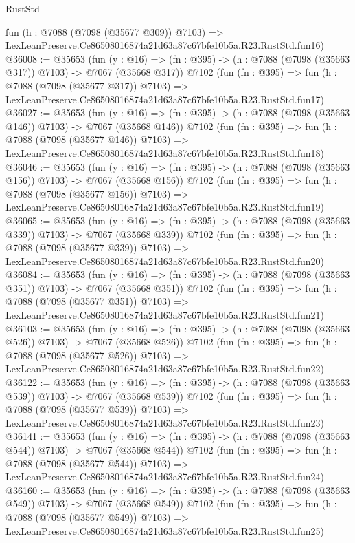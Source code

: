 \begin{lexlean}{RustStd}
\begin{coremodule}
    fun (h : @7088 (@7098 (@35677 @309)) @7103) =>
    LexLeanPreserve.Ce86508016874a21d63a87c67bfe10b5a.R23.RustStd.fun16)
@36008 := @35653
    (fun (y : @16) => (fn : @395) -> (h : @7088 (@7098 (@35663 @317)) @7103) -> @7067 (@35668 @317))
    @7102
    (fun (fn : @395) =>
    fun (h : @7088 (@7098 (@35677 @317)) @7103) =>
    LexLeanPreserve.Ce86508016874a21d63a87c67bfe10b5a.R23.RustStd.fun17)
@36027 := @35653
    (fun (y : @16) => (fn : @395) -> (h : @7088 (@7098 (@35663 @146)) @7103) -> @7067 (@35668 @146))
    @7102
    (fun (fn : @395) =>
    fun (h : @7088 (@7098 (@35677 @146)) @7103) =>
    LexLeanPreserve.Ce86508016874a21d63a87c67bfe10b5a.R23.RustStd.fun18)
@36046 := @35653
    (fun (y : @16) => (fn : @395) -> (h : @7088 (@7098 (@35663 @156)) @7103) -> @7067 (@35668 @156))
    @7102
    (fun (fn : @395) =>
    fun (h : @7088 (@7098 (@35677 @156)) @7103) =>
    LexLeanPreserve.Ce86508016874a21d63a87c67bfe10b5a.R23.RustStd.fun19)
@36065 := @35653
    (fun (y : @16) => (fn : @395) -> (h : @7088 (@7098 (@35663 @339)) @7103) -> @7067 (@35668 @339))
    @7102
    (fun (fn : @395) =>
    fun (h : @7088 (@7098 (@35677 @339)) @7103) =>
    LexLeanPreserve.Ce86508016874a21d63a87c67bfe10b5a.R23.RustStd.fun20)
@36084 := @35653
    (fun (y : @16) => (fn : @395) -> (h : @7088 (@7098 (@35663 @351)) @7103) -> @7067 (@35668 @351))
    @7102
    (fun (fn : @395) =>
    fun (h : @7088 (@7098 (@35677 @351)) @7103) =>
    LexLeanPreserve.Ce86508016874a21d63a87c67bfe10b5a.R23.RustStd.fun21)
@36103 := @35653
    (fun (y : @16) => (fn : @395) -> (h : @7088 (@7098 (@35663 @526)) @7103) -> @7067 (@35668 @526))
    @7102
    (fun (fn : @395) =>
    fun (h : @7088 (@7098 (@35677 @526)) @7103) =>
    LexLeanPreserve.Ce86508016874a21d63a87c67bfe10b5a.R23.RustStd.fun22)
@36122 := @35653
    (fun (y : @16) => (fn : @395) -> (h : @7088 (@7098 (@35663 @539)) @7103) -> @7067 (@35668 @539))
    @7102
    (fun (fn : @395) =>
    fun (h : @7088 (@7098 (@35677 @539)) @7103) =>
    LexLeanPreserve.Ce86508016874a21d63a87c67bfe10b5a.R23.RustStd.fun23)
@36141 := @35653
    (fun (y : @16) => (fn : @395) -> (h : @7088 (@7098 (@35663 @544)) @7103) -> @7067 (@35668 @544))
    @7102
    (fun (fn : @395) =>
    fun (h : @7088 (@7098 (@35677 @544)) @7103) =>
    LexLeanPreserve.Ce86508016874a21d63a87c67bfe10b5a.R23.RustStd.fun24)
@36160 := @35653
    (fun (y : @16) => (fn : @395) -> (h : @7088 (@7098 (@35663 @549)) @7103) -> @7067 (@35668 @549))
    @7102
    (fun (fn : @395) =>
    fun (h : @7088 (@7098 (@35677 @549)) @7103) =>
    LexLeanPreserve.Ce86508016874a21d63a87c67bfe10b5a.R23.RustStd.fun25)

\end{coremodule}
\end{lexlean}
